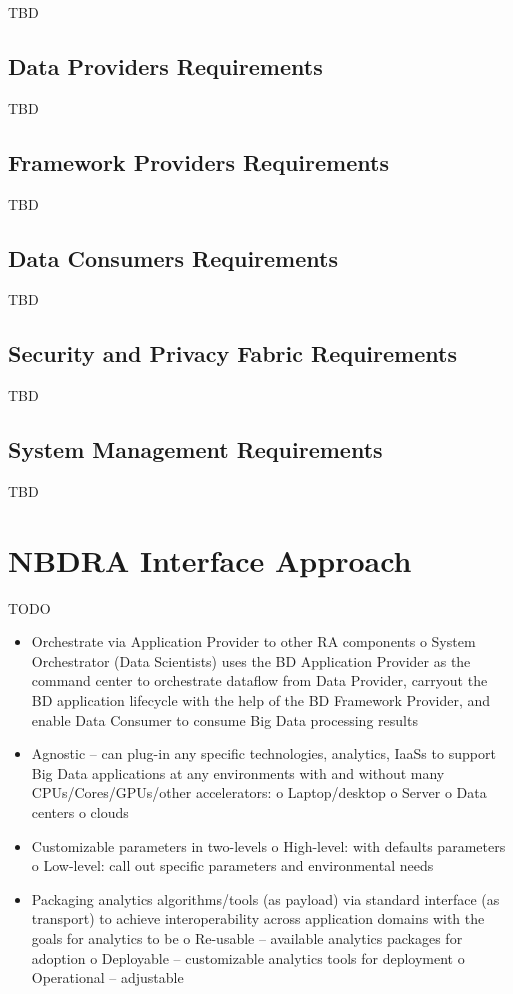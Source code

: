 \documentclass[11pt]{article}
\begin{document}
TBD
\subsection{Data Providers Requirements }

TBD
\subsection{Framework Providers Requirements }

TBD
\subsection{Data Consumers Requirements }

TBD
\subsection{Security and Privacy Fabric Requirements }

TBD
\subsection{System Management Requirements }

TBD

\section{NBDRA Interface Approach}

TODO

\begin{itemize}
\item	Orchestrate via Application Provider to other RA components
o	System Orchestrator (Data Scientists) uses the BD Application Provider as the command 
center to orchestrate dataflow from Data Provider, carryout the BD application lifecycle 
with the help of the BD Framework Provider, and enable Data Consumer to consume Big 
Data processing results 
\item	Agnostic – can plug-in any specific technologies, analytics, IaaSs to support Big Data 
applications at any environments with and without many CPUs/Cores/GPUs/other accelerators:
o	Laptop/desktop
o	Server
o	Data centers
o	clouds
\item	Customizable parameters in two-levels
o	High-level: with defaults parameters
o	Low-level: call out specific parameters and environmental needs
\item	Packaging analytics algorithms/tools (as payload) via standard interface (as transport) to achieve 
interoperability across application domains with the goals for analytics to be
o	Re-usable – available analytics packages for adoption
o	Deployable – customizable analytics tools for deployment
o	Operational – adjustable 
\end{itemize}
\end{document}
